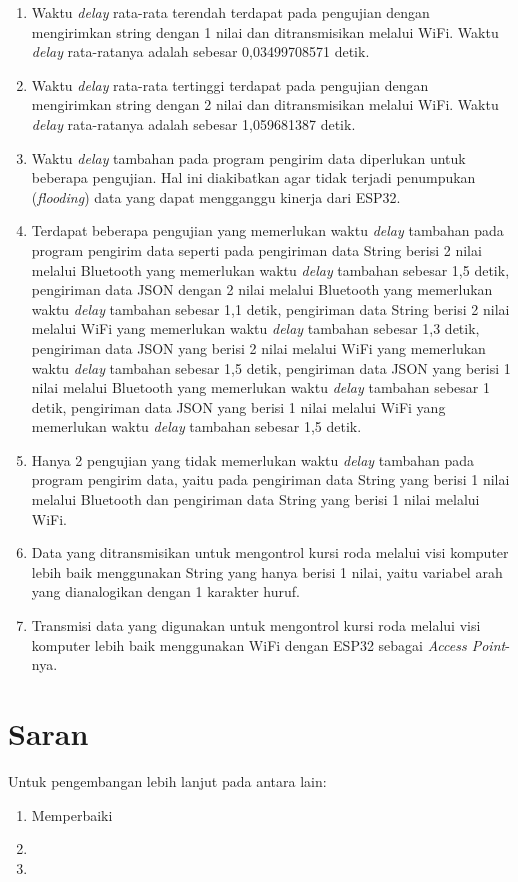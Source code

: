 \begin{enumerate}[nolistsep]

  \item Waktu \emph{delay} rata-rata terendah terdapat pada pengujian dengan mengirimkan string dengan 1 nilai dan ditransmisikan melalui WiFi. Waktu \emph{delay} rata-ratanya adalah sebesar 0,03499708571 detik.

  \item Waktu \emph{delay} rata-rata tertinggi terdapat pada pengujian dengan mengirimkan string dengan 2 nilai dan ditransmisikan melalui WiFi. Waktu \emph{delay} rata-ratanya adalah sebesar 1,059681387 detik.
  
  \item Waktu \emph{delay} tambahan pada program pengirim data diperlukan untuk beberapa pengujian. Hal ini diakibatkan agar tidak terjadi penumpukan (\emph{flooding}) data yang dapat mengganggu kinerja dari ESP32.

  \item Terdapat beberapa pengujian yang memerlukan waktu \emph{delay} tambahan pada program pengirim data seperti pada pengiriman data String berisi 2 nilai melalui Bluetooth yang memerlukan waktu \emph{delay} tambahan sebesar 1,5 detik, pengiriman data JSON dengan 2 nilai melalui Bluetooth yang memerlukan waktu \emph{delay} tambahan sebesar 1,1 detik, pengiriman data String berisi 2 nilai melalui WiFi yang memerlukan waktu \emph{delay} tambahan sebesar 1,3 detik, pengiriman data JSON yang berisi 2 nilai melalui WiFi yang memerlukan waktu \emph{delay} tambahan sebesar 1,5 detik, pengiriman data JSON yang berisi 1 nilai melalui Bluetooth yang memerlukan waktu \emph{delay} tambahan sebesar 1 detik, pengiriman data JSON yang berisi 1 nilai melalui WiFi yang memerlukan waktu \emph{delay} tambahan sebesar 1,5 detik.
  
  \item Hanya 2 pengujian yang tidak memerlukan waktu \emph{delay} tambahan pada program pengirim data, yaitu pada pengiriman data String yang berisi 1 nilai melalui Bluetooth dan pengiriman data String yang berisi 1 nilai melalui WiFi. 
  
  \item Data yang ditransmisikan untuk mengontrol kursi roda melalui visi komputer lebih baik menggunakan String yang hanya berisi 1 nilai, yaitu variabel arah yang dianalogikan dengan 1 karakter huruf. 
  
  \item Transmisi data yang digunakan untuk mengontrol kursi roda melalui visi komputer lebih baik menggunakan WiFi dengan ESP32 sebagai \emph{Access Point}-nya.

\end{enumerate}

\section{Saran}
\label{chap:saran}

Untuk pengembangan lebih lanjut pada \lipsum[1][1-3] antara lain:

\begin{enumerate}[nolistsep]

  \item Memperbaiki \lipsum[2][1-3]

  \item \lipsum[2][4-6]

  \item \lipsum[2][7-10]

\end{enumerate}
